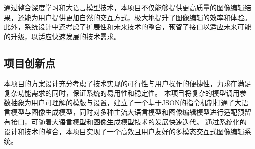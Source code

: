 \documentclass[a4paper,AutoFakeBold,oneside,12pt]{book}
\begin{document}
通过整合深度学习和大语言模型技术，本项目不仅能够提供更高质量的图像编辑结果，还能为用户提供更加自然的交互方式，极大地提升了图像编辑的效率和体验。此外，系统设计中还考虑了扩展性和未来技术的整合，预留了接口以适应未来可能的升级，以适应快速发展的技术需求。

\subsection{项目创新点}
本项目的方案设计充分考虑了技术实现的可行性与用户操作的便捷性，力求在满足复杂功能需求的同时，保证系统的易用性和稳定性。
本项目将复杂的模型调用参数抽象为用户可理解的模版与设置，建立了一个基于JSON的指令机制打通了大语言模型与图像生成模型，同时对多种主流大语言模型和图像编辑模型进行适配预留有接口，可随着大语言模型和图像生成模型技术的发展快速迭代。
通过系统化的设计和技术的整合，本项目实现了一个高效且用户友好的多模态交互式图像编辑系统。
\end{document}
